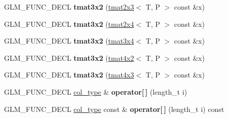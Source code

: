 \begin{DoxyCompactItemize}
\item 
\hypertarget{structglm_1_1detail_1_1tmat3x2_a2accfb7c3f02afa377299db31c7ed798}{G\-L\-M\-\_\-\-F\-U\-N\-C\-\_\-\-D\-E\-C\-L {\bfseries tmat3x2} (\hyperlink{structglm_1_1detail_1_1tmat2x3}{tmat2x3}$<$ T, P $>$ const \&x)}\label{structglm_1_1detail_1_1tmat3x2_a2accfb7c3f02afa377299db31c7ed798}

\item 
\hypertarget{structglm_1_1detail_1_1tmat3x2_a00df9d2a64b9663eb5f15a39a4c7f9ec}{G\-L\-M\-\_\-\-F\-U\-N\-C\-\_\-\-D\-E\-C\-L {\bfseries tmat3x2} (\hyperlink{structglm_1_1detail_1_1tmat2x4}{tmat2x4}$<$ T, P $>$ const \&x)}\label{structglm_1_1detail_1_1tmat3x2_a00df9d2a64b9663eb5f15a39a4c7f9ec}

\item 
\hypertarget{structglm_1_1detail_1_1tmat3x2_a9bd5ce0d6f006d0e52867e4aaa847667}{G\-L\-M\-\_\-\-F\-U\-N\-C\-\_\-\-D\-E\-C\-L {\bfseries tmat3x2} (\hyperlink{structglm_1_1detail_1_1tmat3x4}{tmat3x4}$<$ T, P $>$ const \&x)}\label{structglm_1_1detail_1_1tmat3x2_a9bd5ce0d6f006d0e52867e4aaa847667}

\item 
\hypertarget{structglm_1_1detail_1_1tmat3x2_a7c8be95ce9c562abc043a0d97ef38d55}{G\-L\-M\-\_\-\-F\-U\-N\-C\-\_\-\-D\-E\-C\-L {\bfseries tmat3x2} (\hyperlink{structglm_1_1detail_1_1tmat4x2}{tmat4x2}$<$ T, P $>$ const \&x)}\label{structglm_1_1detail_1_1tmat3x2_a7c8be95ce9c562abc043a0d97ef38d55}

\item 
\hypertarget{structglm_1_1detail_1_1tmat3x2_a2e2513abd10a92e41c9b87e858fb4e1f}{G\-L\-M\-\_\-\-F\-U\-N\-C\-\_\-\-D\-E\-C\-L {\bfseries tmat3x2} (\hyperlink{structglm_1_1detail_1_1tmat4x3}{tmat4x3}$<$ T, P $>$ const \&x)}\label{structglm_1_1detail_1_1tmat3x2_a2e2513abd10a92e41c9b87e858fb4e1f}

\item 
\hypertarget{structglm_1_1detail_1_1tmat3x2_a8ffe61490e2ac7330fca4b01d4c8f6d3}{G\-L\-M\-\_\-\-F\-U\-N\-C\-\_\-\-D\-E\-C\-L \hyperlink{structglm_1_1detail_1_1tvec2}{col\-\_\-type} \& {\bfseries operator\mbox{[}$\,$\mbox{]}} (length\-\_\-t i)}\label{structglm_1_1detail_1_1tmat3x2_a8ffe61490e2ac7330fca4b01d4c8f6d3}

\item 
\hypertarget{structglm_1_1detail_1_1tmat3x2_a6a3310009ad79884e0ff33a5c61ac96b}{G\-L\-M\-\_\-\-F\-U\-N\-C\-\_\-\-D\-E\-C\-L \hyperlink{structglm_1_1detail_1_1tvec2}{col\-\_\-type} const \& {\bfseries operator\mbox{[}$\,$\mbox{]}} (length\-\_\-t i) const }\label{structglm_1_1detail_1_1tmat3x2_a6a3310009ad79884e0ff33a5c61ac96b}


\end{DoxyCompactItemize}
